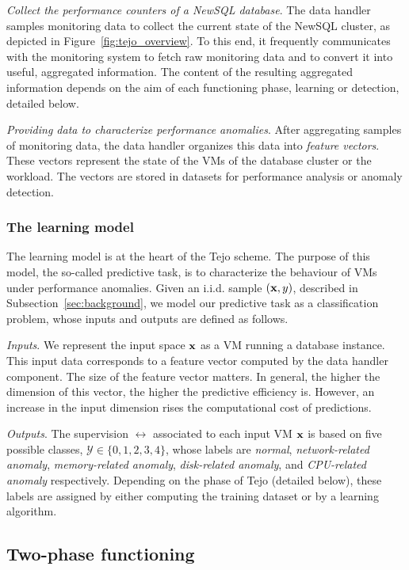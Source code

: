 \emph{Collect the performance counters of a NewSQL database}. The data handler samples monitoring data to collect the current state of the NewSQL cluster, as depicted in Figure~\ref{fig:tejo_overview}. To this end, it frequently communicates with the monitoring system to fetch raw monitoring data and to convert it into useful, aggregated information. The content of the resulting aggregated information depends on the aim of each functioning phase, learning or detection, detailed below. 

\emph{Providing data to characterize performance anomalies}. After aggregating samples of monitoring data, the data handler organizes this data into \emph{feature vectors}. These vectors represent the state of the VMs of the database cluster or the workload. The vectors are stored in datasets for performance analysis or anomaly detection. 

\subsubsection{The learning model} 
The learning model is at the heart of the Tejo scheme. The purpose of this model, the so-called predictive task, is to characterize the behaviour of VMs under performance anomalies. Given an i.i.d. sample $({\bf x},y)$, described in Subsection~\ref{sec:background}, we model our predictive task as a classification problem, whose inputs and outputs are defined as follows.

\emph{Inputs}. We represent the input space ${\bf x}$ as a VM running a database instance. This input data corresponds to a feature vector computed by the data handler component. The size of the feature vector matters. In general, the higher the dimension of this vector, the higher the predictive efficiency is. However, an increase in the input dimension rises the computational cost of predictions.

\emph{Outputs}. The supervision $\rel$ associated to each input VM ${\bf x}$ is based on five possible classes, $\mathcal{Y} \in \{0,1,2,3,4\}$, whose labels are \emph{normal}, \emph{network-related anomaly}, \emph{memory-related anomaly}, \emph{disk-related anomaly}, and \emph{CPU-related anomaly} respectively. Depending on the phase of Tejo (detailed below), these labels are assigned by either computing the training dataset or by a learning algorithm.

\subsection{Two-phase functioning}
\label{subsec:tejo_phases}

